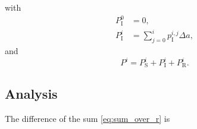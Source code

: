 \documentclass[12pt]{article}
\begin{document}
with
\begin{subequations}
  \label{eq:sum_over_r}
  \begin{align}
    P_{\mathrm{I}}^0 &= 0,
    \\
    P_{\mathrm{I}}^i
    &= \sum_{j = 0}^i p_{\mathrm{I}}^{i, j} \Delta a,
  \end{align}
\end{subequations}
and
\begin{equation}
  P^i =  P_{\mathrm{S}}^i + P_{\mathrm{I}}^i + P_{\mathrm{R}}^i.
\end{equation}


\subsection{Analysis}

The difference of the sum \eqref{eq:sum_over_r} is
\end{document}
